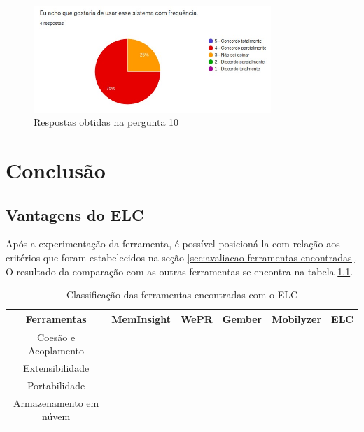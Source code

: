 \documentclass[12pt]{tcc}
\newcommand{\cmark}{\ding{51}}
\newcommand{\xmark}{\ding{55}}
\begin{document}
\begin{figure}[!ht]
	\centering
	\includegraphics[width=0.8\textwidth]{figures/respostas-pergunta-10.jpeg}
	\caption{Respostas obtidas na pergunta 10}
	\label{fig:respostas-pergunta-10}
\end{figure}



\chapter{Conclusão}
\label{cap:conclusão}

\section{Vantagens do ELC}
\label{subsection:classificando-o-elc}

\par Após a experimentação da ferramenta, é possível posicioná-la com relação aos critérios que foram estabelecidos na seção \ref{sec:avaliacao-ferramentas-encontradas}. O resultado da comparação com as outras ferramentas se encontra na tabela \ref{table:classificacao-com-elc}.

\begin{table}[ht]
\caption{Classificação das ferramentas encontradas com o ELC} %
\centering %
\begin{tabular}{c c c c c c} %
\toprule %

\textbf{Ferramentas} &\textbf{MemInsight} & \textbf{WePR} & \textbf{Gember} & \textbf{Mobilyzer} & \textbf{ELC}  \\ [0.4ex]

\midrule %
Coesão e Acoplamento & \cmark & \cmark & \cmark & \cmark  & \cmark  \\ 
Extensibilidade & \xmark & \xmark & \xmark & \xmark  & \cmark \\
Portabilidade & \cmark & \xmark & \xmark & \xmark  & \cmark \\
Armazenamento em núvem & \xmark & \cmark & \cmark & \cmark & \cmark  \\
\bottomrule %
\end{tabular}
\label{table:classificacao-com-elc} %
\end{table}
\end{document}

